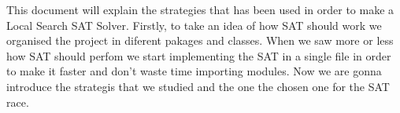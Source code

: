 
This document will explain the strategies that has been used in order to make a Local Search SAT Solver. Firstly, to take an idea of how SAT should work we organised the project in diferent pakages and classes. When we saw more or less how SAT should perfom we start implementing the SAT in a single file in order to make it faster and don't waste time importing modules. Now we are gonna introduce the strategis that we studied and the one the chosen one for the SAT race.

